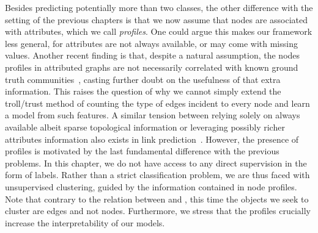 \medskip
Besides predicting potentially more than two classes, the other difference with the setting of the
previous chapters is that we now assume that nodes are associated with attributes, which we call
\emph{profiles}. One could argue this makes our framework less general, for attributes are not
always available, or may come with missing values. Another recent finding is that, despite a natural
assumption, the nodes profiles in attributed graphs are not necessarily correlated with known ground
truth communities~\autocite{FortunatoGroundTruth14}, casting further doubt on the usefulness of that
extra information.
This raises the question of why we cannot simply extend the troll/trust method of counting the type
of edges incident to every node and learn a model from such features.
A similar tension between relying solely on always available albeit sparse topological information or
leveraging possibly richer attributes information also exists in link
prediction~\autocite{linkPredSurvey16}. %
However, the presence of profiles is motivated by the last fundamental difference with the previous
problems. In this chapter, we do not have access to any direct supervision in the form of labels.
Rather than a strict classification problem, we are thus faced with unsupervised clustering, guided
by the information contained in node profiles. Note that contrary to the relation between \pcc{} and
\esp{}, this time the objects we seek to cluster are edges and not nodes. Furthermore, we stress
that the profiles crucially increase the interpretability of our models.

